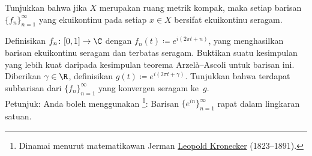 \begin{exercise}
Tunjukkan bahwa jika $X$ merupakan ruang metrik kompak, maka
setiap barisan $\{ f_n \}_{n=1}^\infty$ yang ekuikontinu pada setiap $x \in X$
bersifat ekuikontinu seragam.
\end{exercise}

\begin{exercise}
Definisikan $f_n \colon [0,1] \to \C$ dengan $f_n(t) \coloneqq e^{i(2\pi t + n)}$,
yang menghasilkan barisan ekuikontinu seragam dan terbatas seragam.
Buktikan suatu kesimpulan yang lebih kuat daripada kesimpulan teorema Arzel\`a--Ascoli untuk barisan ini.
Diberikan $\gamma \in \R$,
definisikan $g(t) \coloneqq e^{i(2\pi t + \gamma)}$.  Tunjukkan bahwa terdapat
subbarisan dari $\{ f_n \}_{n=1}^\infty$ yang konvergen seragam ke~$g$.
\\
Petunjuk: Anda boleh menggunakan \emph{}\footnote{%
Dinamai menurut matematikawan Jerman
\href{https://en.wikipedia.org/wiki/Leopold_Kronecker}{Leopold Kronecker}
(1823--1891).}:
Barisan $\{ e^{in} \}_{n=1}^\infty$ rapat dalam lingkaran satuan.
\end{exercise}

